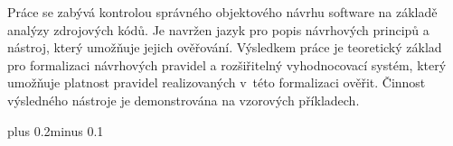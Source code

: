 \documentclass[11pt,twoside,a4paper]{book}
\begin{document}

\baselineskip

\noindent
Práce se zabývá kontrolou správného objektového návrhu software na základě analýzy zdrojových kódů. Je navržen jazyk pro popis návrhových principů a nástroj, který umožňuje jejich ověřování. Výsledkem práce je teoretický základ pro formalizaci návrhových pravidel a rozšiřitelný vyhodnocovací systém, který umožňuje platnost pravidel realizovaných v~této formalizaci ověřit. Činnost výsledného nástroje je demonstrována na vzorových příkladech.

%
%
\tableofcontents

%
%
\listoffigures

%
%
\listoftables

\lstlistoflistings

%
%

\mainbodystarts
\normalfont
{}\baselineskip plus 0.2\baselineskip minus 0.1\baselineskip

%
%










{
  \def\CS{$\cal C\kern-0.1667em\lower.5ex\hbox{$\cal S$}\kern-0.075em $}
  
}

\appendix




\end{document}
